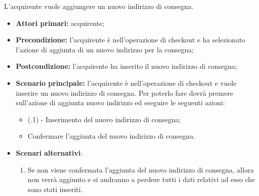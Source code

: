 
L'acquirente vuole aggiungere un nuovo indirizzo di consegna.
\begin{itemize}
    \item \textbf{Attori primari:} acquirente;
    \item \textbf{Precondizione:} l'acquirente è nell'operazione di checkout e ha selezionato l'azione di aggiunta di un nuovo indirizzo per la consegna;
    \item \textbf{Postcondizione:} l'acquirente ha inserito il nuovo indirizzo di consegna;
    \item \textbf{Scenario principale:} l'acquirente è nell'operazione di checkout e vuole inserire un nuovo indirizzo di consegna. Per poterlo fare dovrà premere sull'azione di aggiunta nuovo indirizzo ed eseguire le seguenti azioni:
    \begin{itemize}
        \item (\actualUC.1) - Inserimento del nuovo indirizzo di consegna; 
        \item Confermare l'aggiunta del nuovo indirizzo di consegna.
    \end{itemize}
    \item \textbf{Scenari alternativi}:
    \begin{enumerate}[label=\lett]
        \item Se non viene confermata l'aggiunta del nuovo indirizzo di consegna, allora non verrà aggiunto e si andranno a perdere tutti i dati relativi ad esso che sono stati inseriti.
    \end{enumerate}
\end{itemize}

\resetSubUC

